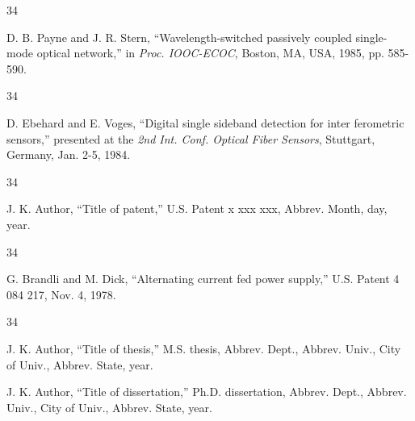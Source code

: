 \documentclass{IEEEojcsys}
\begin{document}
\vspace*{-12pt}

\begin{thebibliography}{34}
\setcounter{enumiv}{21}

\bibitem{}D. B. Payne and J. R. Stern, ``Wavelength-switched passively coupled single-mode optical network,'' in {\em Proc. IOOC-ECOC}, Boston, MA, USA, 1985,
pp. 585-590. %

\end{thebibliography}

\vspace*{-12pt}

\begin{thebibliography}{34}
\setcounter{enumiv}{22}

\bibitem{}D. Ebehard and E. Voges, ``Digital single sideband detection for inter ferometric sensors,'' presented at the {\em 2nd Int. Conf. Optical Fiber Sensors}, Stuttgart, Germany, Jan. 2-5, 1984.
\end{thebibliography}

\vspace*{-12pt}
\begin{thebibliography}{34}
\item[]\hskip-18pt J. K. Author, ``Title of patent,'' U.S. Patent x xxx xxx, Abbrev. Month, day, year.
\end{thebibliography}\vspace*{-14pt}


\vspace*{-12pt}

\begin{thebibliography}{34}
\setcounter{enumiv}{23}

\bibitem{}G. Brandli and M. Dick, ``Alternating current fed power supply,'' U.S. Patent 4 084 217, Nov. 4, 1978.
\end{thebibliography}{\vfill\pagebreak}

\vspace*{-12pt}
\begin{thebibliography}{34}\itemindent-6.5pt
\item[a)] J. K. Author, ``Title of thesis,'' M.S. thesis, Abbrev. Dept., Abbrev. Univ., City of Univ., Abbrev. State, year.

\item[b)] J. K. Author, ``Title of dissertation,'' Ph.D. dissertation, Abbrev. Dept., Abbrev. Univ., City of Univ., Abbrev. State, year.
\end{thebibliography}\vspace*{-14pt}
\end{document}
